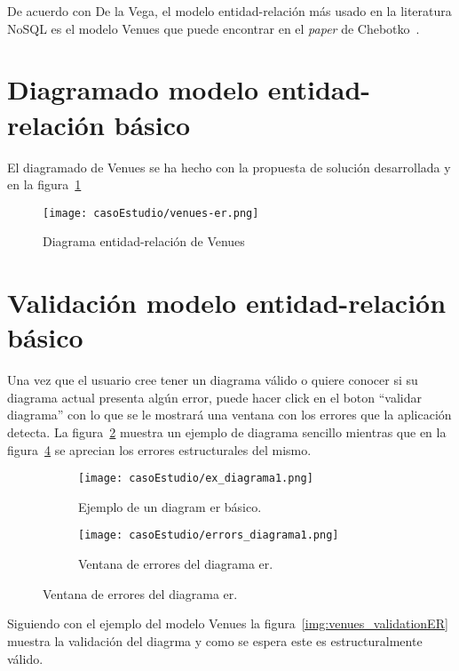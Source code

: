 
De acuerdo con De la Vega\cite{de_la_vega_mortadelo_2020}, el modelo entidad-relación más usado en la literatura NoSQL es el modelo Venues que puede encontrar en el \textit{paper} de Chebotko~\cite{chebotko_big_2015}.

\section{Diagramado modelo entidad-relación básico}

El diagramado de Venues se ha hecho con la propuesta de solución desarrollada y en la figura~\ref{img:venues-er}

\begin{figure}[H]
    \centering
    \texttt{[image: casoEstudio/venues-er.png]}
    \caption{Diagrama entidad-relación de Venues}
    \label{img:venues-er}
\end{figure}

\section{Validación modelo entidad-relación básico}

 Una vez que el usuario cree tener un diagrama válido o quiere conocer si su diagrama actual presenta algún error, puede hacer click en el boton ``validar diagrama'' con lo que se le mostrará una ventana con los errores que la aplicación detecta. La figura~\ref{img:ex_diagrama1} muestra un ejemplo de diagrama sencillo mientras que en la figura~\ref{img:errors_diagrama1} se aprecian los errores estructurales del mismo.

 \begin{figure}[H]
  \begin{subfigure}[b]{0.49\textwidth}
      \texttt{[image: casoEstudio/ex\_diagrama1.png]}
      \caption{Ejemplo de un diagram er básico.}
      \label{img:ex_diagrama1}
    \end{subfigure}
    \hfill
    \begin{subfigure}[b]{0.49\textwidth}
      \texttt{[image: casoEstudio/errors\_diagrama1.png]}
      \caption{Ventana de errores del diagrama er.}
      \label{img:errors_diagrama1}
    \end{subfigure}
\end{figure}

 Siguiendo con el ejemplo del modelo Venues la figura~\ref{img:venues_validationER} muestra la validación del diagrma y como se espera este es estructuralmente válido.

